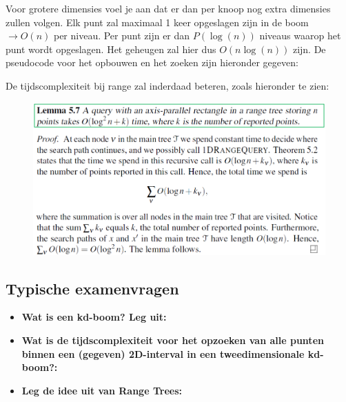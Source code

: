 \documentclass[12pt,a4paper]{article}
\begin{document}
	Voor grotere dimensies voel je aan dat er dan per knoop nog extra dimensies zullen volgen. Elk punt zal maximaal 1 keer opgeslagen zijn in de boom $\rightarrow O(n)$ per niveau. Per punt zijn er dan $P(\log(n))$ niveaus  waarop het punt wordt opgeslagen. Het geheugen zal hier dus $O(n\log(n))$ zijn. De pseudocode voor het opbouwen en het zoeken zijn hieronder gegeven: 
	\begin{figure}[H]
		\centering
		\label{fig:range-treees-pseudocode}
	\end{figure}

	De tijdscomplexiteit bij range zal inderdaad beteren, zoals hieronder te zien: 
	
	\begin{figure}[H]
		\centering
		\includegraphics[width=0.7\linewidth]{afbeeldingen/kd-bomen/rangetrees-tijdscomplexiteit}
		\label{fig:rangetrees-tijdscomplexiteit}
	\end{figure}
	 
	
	
	\subsection{Typische examenvragen}
	\begin{itemize}
		\item \textbf{Wat is een kd-boom? Leg uit:}\\
		\item \textbf{Wat is de tijdscomplexiteit voor het opzoeken van alle punten binnen een (gegeven) 2D-interval in een tweedimensionale kd-boom?:}\\
		\item \textbf{Leg de idee uit van Range Trees:}\\
	\end{itemize}
	
\end{document}

